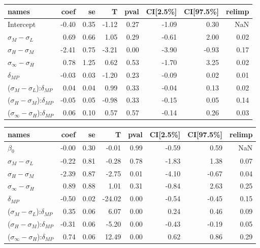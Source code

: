 \begin{tabular}{lrrrrrrr}
\toprule
                                         names &  coef &   se &     T &  pval &  CI[2.5\%] &  CI[97.5\%] &  relimp \\
\midrule
                                     Intercept & -0.40 & 0.35 & -1.12 &  0.27 &      -1.09 &        0.30 &     NaN \\
                     $\sigma_{M} - \sigma_{L}$ &  0.69 & 0.66 &  1.05 &  0.29 &      -0.61 &        2.00 &    0.02 \\
                     $\sigma_{H} - \sigma_{M}$ & -2.41 & 0.75 & -3.21 &  0.00 &      -3.90 &       -0.93 &    0.17 \\
                $\sigma_{\infty} - \sigma_{H}$ &  0.78 & 1.25 &  0.62 &  0.53 &      -1.70 &        3.25 &    0.02 \\
                                 $\delta_{MP}$ & -0.03 & 0.03 & -1.20 &  0.23 &      -0.09 &        0.02 &    0.01 \\
     ($\sigma_{M} - \sigma_{L}$):$\delta_{MP}$ &  0.04 & 0.04 &  0.99 &  0.33 &      -0.04 &        0.13 &    0.02 \\
     ($\sigma_{H} - \sigma_{M}$):$\delta_{MP}$ & -0.05 & 0.05 & -0.98 &  0.33 &      -0.15 &        0.05 &    0.14 \\
($\sigma_{\infty} - \sigma_{H}$):$\delta_{MP}$ &  0.06 & 0.10 &  0.57 &  0.57 &      -0.14 &        0.26 &    0.03 \\
\bottomrule
\end{tabular}


\begin{tabular}{lrrrrrrr}
\toprule
                                         names &  coef &   se &      T &  pval &  CI[2.5\%] &  CI[97.5\%] &  relimp \\
\midrule
                                   $\beta_{0}$ & -0.00 & 0.30 &  -0.01 &  0.99 &      -0.59 &        0.59 &     NaN \\
                     $\sigma_{M} - \sigma_{L}$ & -0.22 & 0.81 &  -0.28 &  0.78 &      -1.83 &        1.38 &    0.07 \\
                     $\sigma_{H} - \sigma_{M}$ & -2.39 & 0.87 &  -2.75 &  0.01 &      -4.10 &       -0.67 &    0.04 \\
                $\sigma_{\infty} - \sigma_{H}$ &  0.89 & 0.88 &   1.01 &  0.31 &      -0.84 &        2.63 &    0.25 \\
                                 $\delta_{MP}$ & -0.50 & 0.02 & -24.02 &  0.00 &      -0.54 &       -0.45 &    0.15 \\
     ($\sigma_{M} - \sigma_{L}$):$\delta_{MP}$ &  0.35 & 0.06 &   6.07 &  0.00 &       0.24 &        0.46 &    0.09 \\
     ($\sigma_{H} - \sigma_{M}$):$\delta_{MP}$ & -0.31 & 0.06 &  -5.20 &  0.00 &      -0.43 &       -0.19 &    0.05 \\
($\sigma_{\infty} - \sigma_{H}$):$\delta_{MP}$ &  0.74 & 0.06 &  12.49 &  0.00 &       0.62 &        0.86 &    0.29 \\
\bottomrule
\end{tabular}
